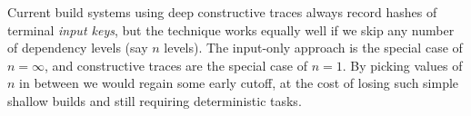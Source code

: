 Current build systems using deep constructive traces always record hashes of
terminal \emph{input keys}, but the technique works equally well if we skip any
number of dependency levels (say $n$ levels). The input-only approach is the
special case of $n = \infty$, and constructive traces are the special case of
$n = 1$. By picking values of $n$ in between we would regain some early cutoff, at the
cost of losing such simple shallow builds and still requiring deterministic tasks.
